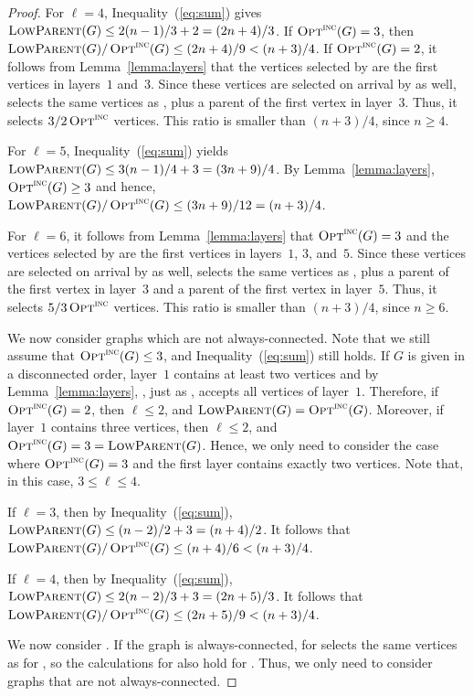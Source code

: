 \begin{proof}
For $\ell=4$,
 Inequality~(\ref{eq:sum}) gives
$\operatorname{\textsc{LowParent}}(G)\leq 2(n-1)/3+2 = (2n+4)/3$. 
If $\operatorname{\textsc{Opt}}^\textsc{\ensuremath{\text{inc}}}(G) = 3$, then
$\operatorname{\textsc{LowParent}}(G) / \operatorname{\textsc{Opt}}^\textsc{\ensuremath{\text{inc}}}(G) \leq (2n+4)/9 < 
(n+3)/4$.
If $\operatorname{\textsc{Opt}}^\textsc{\ensuremath{\text{inc}}}(G)=2$, it follows from Lemma~\ref{lemma:layers} that the
vertices selected by \onopt are the first vertices
in layers~$1$ and~$3$.
Since these vertices are selected on arrival 
by \alayersparent as well, 
\alayersparent selects the same vertices as \onopt, plus
a parent of the first vertex in layer~$3$.
Thus, it selects $3/2 \operatorname{\textsc{Opt}}^\textsc{\ensuremath{\text{inc}}}$ vertices.
This ratio is smaller than $(n+3)/4$, since $n\geq 4$.

For $\ell=5$, Inequality~(\ref{eq:sum}) yields 
$\operatorname{\textsc{LowParent}}(G)\leq 3(n-1)/4+3 = (3n+9)/4$. 
By Lemma~\ref{lemma:layers}, $\operatorname{\textsc{Opt}}^\textsc{\ensuremath{\text{inc}}}(G) \geq 3$ and hence,
$\operatorname{\textsc{LowParent}}(G) / \operatorname{\textsc{Opt}}^\textsc{\ensuremath{\text{inc}}}(G) \leq (3n+9)/12 = (n+3)/4$. 

For $\ell=6$, it follows from Lemma~\ref{lemma:layers} that $\operatorname{\textsc{Opt}}^\textsc{\ensuremath{\text{inc}}}(G)
= 3$ and the vertices selected by \onopt are the first vertices in
layers~$1$, $3$, and~$5$.
Since these vertices are selected on arrival
by \alayersparent as well, 
\alayersparent selects the same vertices as \onopt, plus
a parent of the first vertex in layer~$3$ and a parent of the first
vertex in layer~$5$.
Thus, it selects $5/3 \operatorname{\textsc{Opt}}^\textsc{\ensuremath{\text{inc}}}$ vertices.
This ratio is smaller than $(n+3)/4$, since $n\geq 6$.

We now consider graphs which are not always-connected.
Note that we still assume that $\operatorname{\textsc{Opt}}^\textsc{\ensuremath{\text{inc}}}(G) \le 3$, and
Inequality~(\ref{eq:sum}) still holds.
If $G$ is given in a disconnected order, layer~$1$ contains at least
two vertices and by Lemma~\ref{lemma:layers}, \onopt, just as
\alayersparent, accepts all vertices of layer~$1$. 
Therefore, if $\operatorname{\textsc{Opt}}^\textsc{\ensuremath{\text{inc}}}(G)=2$, then $\ell \leq 2$, and
$\operatorname{\textsc{LowParent}}(G)=\operatorname{\textsc{Opt}}^\textsc{\ensuremath{\text{inc}}}(G)$. 
Moreover, if layer~$1$ contains three vertices,
then $\ell \leq 2$, and $\operatorname{\textsc{Opt}}^\textsc{\ensuremath{\text{inc}}}(G) = 3 = \operatorname{\textsc{LowParent}}(G)$. 
Hence, we only need to consider the case where $\operatorname{\textsc{Opt}}^\textsc{\ensuremath{\text{inc}}}(G)=3$ and the
first layer contains exactly two vertices.
Note that, in this case, $3 \leq \ell \leq 4$.

If $\ell=3$, then by Inequality~(\ref{eq:sum}),
$\operatorname{\textsc{LowParent}}(G) \leq (n-2)/2+3 = (n+4)/2$.
It follows that $\operatorname{\textsc{LowParent}}(G)/\operatorname{\textsc{Opt}}^\textsc{\ensuremath{\text{inc}}}(G) \leq (n+4)/6 < (n+3)/4$.

If $\ell=4$, then by Inequality~(\ref{eq:sum}),
$\operatorname{\textsc{LowParent}}(G) \leq 2(n-2)/3+3 = (2n+5)/3$.
It follows that $\operatorname{\textsc{LowParent}}(G)/\operatorname{\textsc{Opt}}^\textsc{\ensuremath{\text{inc}}}(G) \leq (2n+5)/9 < (n+3)/4$.

We now consider \cds.
If the graph is always-connected, \alayersparent for \cds selects the same
vertices as for \ds, so the calculations for \ds also hold for \cds.
Thus, we only need to consider graphs that are not always-connected.


\end{proof}

